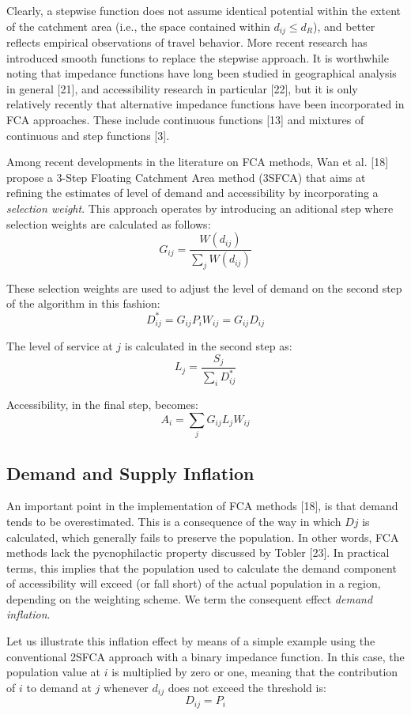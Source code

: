 \documentclass[10pt,letterpaper]{article}
\begin{document}
Clearly, a stepwise function does not assume identical potential within
the extent of the catchment area (i.e., the space contained within
\(d_{ij} \leq d_R\)), and better reflects empirical observations of
travel behavior. More recent research has introduced smooth functions to
replace the stepwise approach. It is worthwhile noting that impedance
functions have long been studied in geographical analysis in general
{[}21{]}, and accessibility research in particular {[}22{]}, but it is
only relatively recently that alternative impedance functions have been
incorporated in FCA approaches. These include continuous functions
{[}13{]} and mixtures of continuous and step functions {[}3{]}.

Among recent developments in the literature on FCA methods, Wan et al.
{[}18{]} propose a 3-Step Floating Catchment Area method (3SFCA) that
aims at refining the estimates of level of demand and accessibility by
incorporating a \emph{selection weight}. This approach operates by
introducing an aditional step where selection weights are calculated as
follows: \[
G_{ij}=\frac{W(d_{ij})}{\sum_jW(d_{ij})}
\]

These selection weights are used to adjust the level of demand on the
second step of the algorithm in this fashion: \[
D^*_{ij} = G_{ij}P_iW_{ij} = G_{ij}D_{ij}
\]

The level of service at \(j\) is calculated in the second step as: \[
L_j=\frac{S_j}{\sum_iD^*_{ij}}
\]

Accessibility, in the final step, becomes: \[
A_i = \sum_jG_{ij}L_jW_{ij}
\]

\subsection{Demand and Supply
Inflation}\label{demand-and-supply-inflation}

An important point in the implementation of FCA methods {[}18{]}, is
that demand tends to be overestimated. This is a consequence of the way
in which \(Dj\) is calculated, which generally fails to preserve the
population. In other words, FCA methods lack the pycnophilactic property
discussed by Tobler {[}23{]}. In practical terms, this implies that the
population used to calculate the demand component of accessibility will
exceed (or fall short) of the actual population in a region, depending
on the weighting scheme. We term the consequent effect \emph{demand
inflation}.

Let us illustrate this inflation effect by means of a simple example
using the conventional 2SFCA approach with a binary impedance function.
In this case, the population value at \(i\) is multiplied by zero or
one, meaning that the contribution of \(i\) to demand at \(j\) whenever
\(d_{ij}\) does not exceed the threshold is: \[
D_{ij} = P_i
\]
\end{document}
